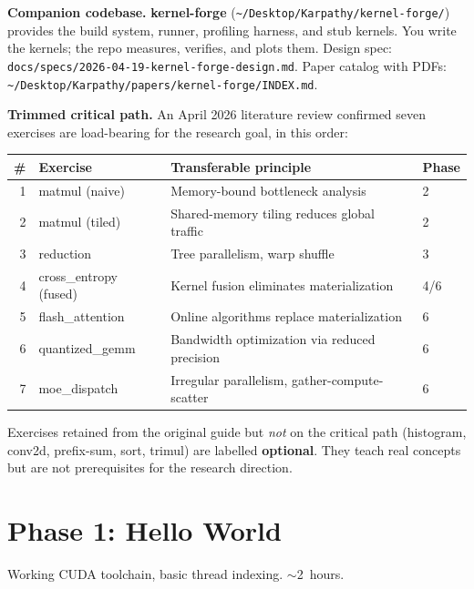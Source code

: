 \documentclass[11pt, letterpaper]{article}
\begin{document}
\textbf{Companion codebase.} \textbf{kernel-forge} (\texttt{\~{}/Desktop/Karpathy/kernel-forge/}) provides the build system, runner, profiling harness, and stub kernels. You write the kernels; the repo measures, verifies, and plots them. Design spec: \texttt{docs/specs/2026-04-19-kernel-forge-design.md}. Paper catalog with PDFs: \texttt{\~{}/Desktop/Karpathy/papers/kernel-forge/INDEX.md}.

\textbf{Trimmed critical path.} An April 2026 literature review confirmed seven exercises are load-bearing for the research goal, in this order:

\medskip
\begin{tabularx}{\textwidth}{@{}rlXl@{}}
\toprule
\textbf{\#} & \textbf{Exercise} & \textbf{Transferable principle} & \textbf{Phase} \\
\midrule
1 & matmul (naive) & Memory-bound bottleneck analysis & 2 \\
2 & matmul (tiled) & Shared-memory tiling reduces global traffic & 2 \\
3 & reduction & Tree parallelism, warp shuffle & 3 \\
4 & cross\_entropy (fused) & Kernel fusion eliminates materialization & 4/6 \\
5 & flash\_attention & Online algorithms replace materialization & 6 \\
6 & quantized\_gemm & Bandwidth optimization via reduced precision & 6 \\
7 & moe\_dispatch & Irregular parallelism, gather-compute-scatter & 6 \\
\bottomrule
\end{tabularx}

\medskip
Exercises retained from the original guide but \emph{not} on the critical path (histogram, conv2d, prefix-sum, sort, trimul) are labelled \textbf{optional}. They teach real concepts but are not prerequisites for the research direction.

\section{Phase 1: Hello World}

\begin{phasebox}[Goal]
Working CUDA toolchain, basic thread indexing. $\sim$2~hours.
\end{phasebox}
\end{document}
